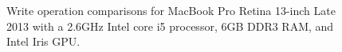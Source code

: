 \begin{figure}[!htb]
\centering
{}


\caption{Write operation comparisons for MacBook Pro Retina 13-inch Late 2013 with a 2.6GHz Intel core i5 processor, 6GB DDR3 RAM, and Intel Iris GPU.
\label{fig:perf-macbook-write}}
\end{figure}


